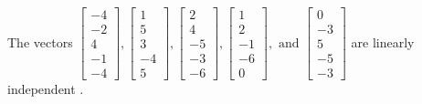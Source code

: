 \begin{exercise}
\begin{exerciseStatement}
  \end{exerciseStatement}
  \begin{exerciseAnswer}
   The vectors \(\left[\begin{array}{r}
-4 \\
-2 \\
4 \\
-1 \\
-4
\end{array}\right] , \left[\begin{array}{r}
1 \\
5 \\
3 \\
-4 \\
5
\end{array}\right] , \left[\begin{array}{r}
2 \\
4 \\
-5 \\
-3 \\
-6
\end{array}\right] , \left[\begin{array}{r}
1 \\
2 \\
-1 \\
-6 \\
0
\end{array}\right] , \text{ and } \left[\begin{array}{r}
0 \\
-3 \\
5 \\
-5 \\
-3
\end{array}\right]\) are 
  	 linearly independent  .
  


  \end{exerciseAnswer}
\end{exercise}